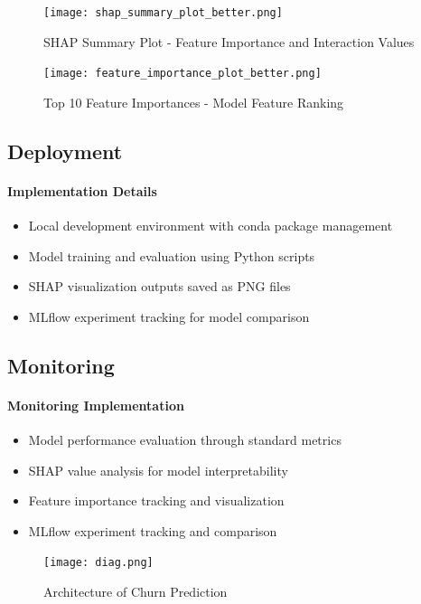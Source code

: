 \documentclass{article}
\begin{document}
\begin{figure}[H]
    \centering
    \texttt{[image: shap\_summary\_plot\_better.png]}
    \caption{SHAP Summary Plot - Feature Importance and Interaction Values}
    \label{fig:shap_summary}
\end{figure}

\begin{figure}[H]
    \centering
    \texttt{[image: feature\_importance\_plot\_better.png]}
    \caption{Top 10 Feature Importances - Model Feature Ranking}
    \label{fig:feature_importance}
\end{figure}

\subsection{Deployment}

\paragraph{Implementation Details}
\begin{itemize}
    \item Local development environment with conda package management
    \item Model training and evaluation using Python scripts
    \item SHAP visualization outputs saved as PNG files
    \item MLflow experiment tracking for model comparison
\end{itemize}

\subsection{Monitoring}

\paragraph{Monitoring Implementation}
\begin{itemize}
    \item Model performance evaluation through standard metrics
    \item SHAP value analysis for model interpretability
    \item Feature importance tracking and visualization
    \item MLflow experiment tracking and comparison
\end{itemize}

\begin{figure}[h]
    \centering
    \texttt{[image: diag.png]}
    \caption{Architecture of Churn Prediction}
    \label{fig:your-label}
\end{figure}
\end{document}
